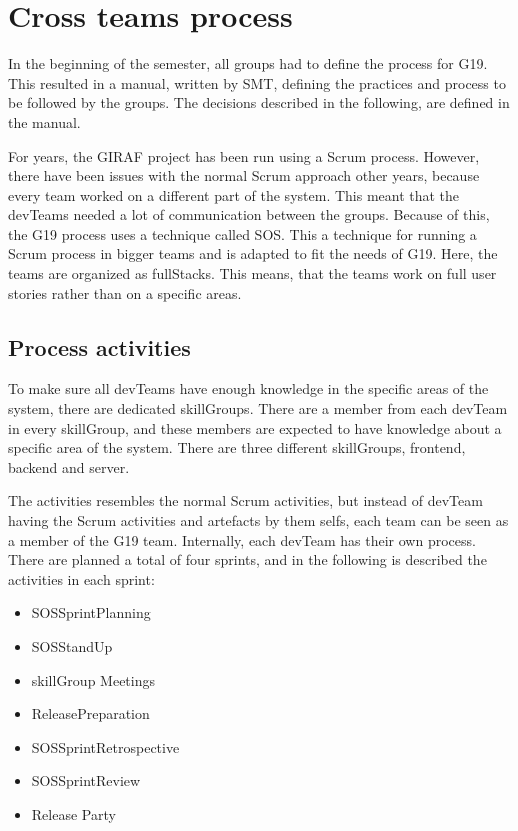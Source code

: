 \section{Cross teams process}
In the beginning of the semester, all groups had to define the process for \gls{G19}. 
This resulted in a manual\cite{processManual}, written by \gls{SMT}, defining the practices and process to be followed by the groups. The decisions described in the following, are defined in the manual. 


For years, the GIRAF project has been run using a Scrum process. However, there have been issues with the normal Scrum approach other years, because every team worked on a different part of the system\cite{fullStackVSSpecific}. This meant that the \glspl{devTeam} needed a lot of communication between the groups. Because of this, the \gls{G19} process uses a technique called \gls{SOS}. This a technique for running a Scrum process in bigger teams and is adapted to fit the needs of \gls{G19}.
Here, the teams are organized as \Glspl{fullStack}. This means, that the teams work on full user stories rather than on a specific areas. 

\subsection*{Process activities}

To make sure all \glspl{devTeam} have enough knowledge in the specific areas of the system, there are dedicated \glspl{skillGroup}. There are a member from each \gls{devTeam} in every \gls{skillGroup}, and these members are expected to have knowledge about a specific area of the system. There are three different \glspl{skillGroup}, frontend, backend and server. 

The activities resembles the normal Scrum activities, but instead of \gls{devTeam} having the Scrum activities and artefacts by them selfs, each team can be seen as a member of the \gls{G19} team. Internally, each \gls{devTeam} has their own process. There are planned a total of four sprints, and in the following is described the activities in each sprint:

\begin{itemize}
    \item \Gls{SOSSprintPlanning}
    \item \Gls{SOSStandUp}
    \item \Gls{skillGroup} Meetings
    \item \Gls{ReleasePreparation}
    \item \Gls{SOSSprintRetrospective}
    \item \Gls{SOSSprintReview}
    \item Release Party
\end{itemize}

